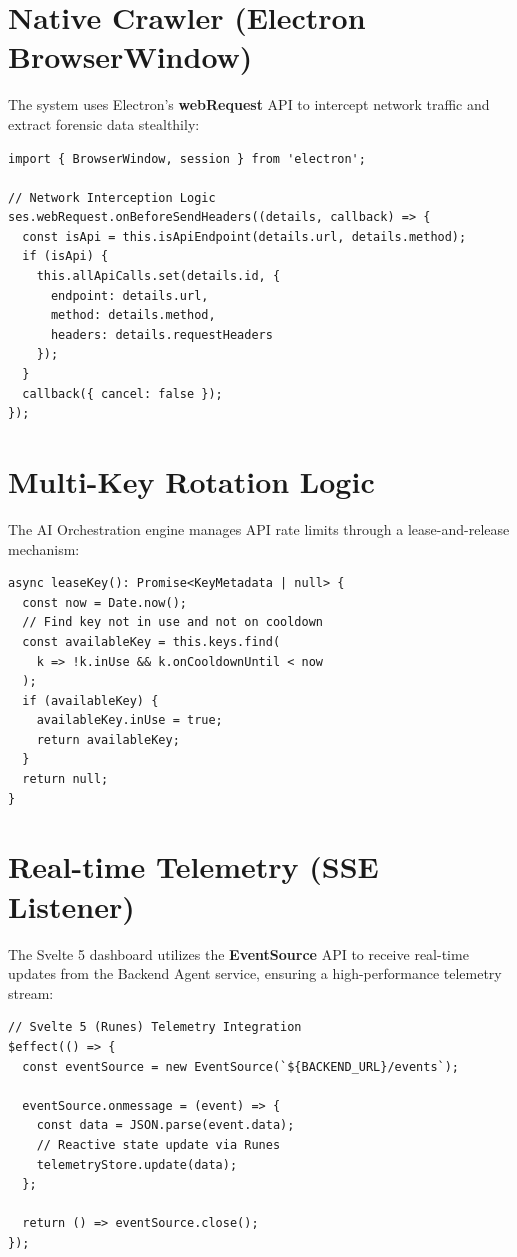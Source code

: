 \documentclass[12pt,oneside,a4paper]{book}
\begin{document}
\begin{appendices}
\section{Native Crawler (Electron BrowserWindow)}
The system uses Electron's \textbf{webRequest} API to intercept network traffic and extract forensic data stealthily:
\begin{verbatim}
import { BrowserWindow, session } from 'electron';

// Network Interception Logic
ses.webRequest.onBeforeSendHeaders((details, callback) => {
  const isApi = this.isApiEndpoint(details.url, details.method);
  if (isApi) {
    this.allApiCalls.set(details.id, {
      endpoint: details.url,
      method: details.method,
      headers: details.requestHeaders
    });
  }
  callback({ cancel: false });
});
\end{verbatim}

\section{Multi-Key Rotation Logic}
The AI Orchestration engine manages API rate limits through a lease-and-release mechanism:
\begin{verbatim}
async leaseKey(): Promise<KeyMetadata | null> {
  const now = Date.now();
  // Find key not in use and not on cooldown
  const availableKey = this.keys.find(
    k => !k.inUse && k.onCooldownUntil < now
  );
  if (availableKey) {
    availableKey.inUse = true;
    return availableKey;
  }
  return null;
}
\end{verbatim}

\section{Real-time Telemetry (SSE Listener)}
The Svelte 5 dashboard utilizes the \textbf{EventSource} API to receive real-time updates from the Backend Agent service, ensuring a high-performance telemetry stream:
\begin{verbatim}
// Svelte 5 (Runes) Telemetry Integration
$effect(() => {
  const eventSource = new EventSource(`${BACKEND_URL}/events`);
  
  eventSource.onmessage = (event) => {
    const data = JSON.parse(event.data);
    // Reactive state update via Runes
    telemetryStore.update(data);
  };

  return () => eventSource.close();
});
\end{verbatim}


\end{appendices}
\end{document}
